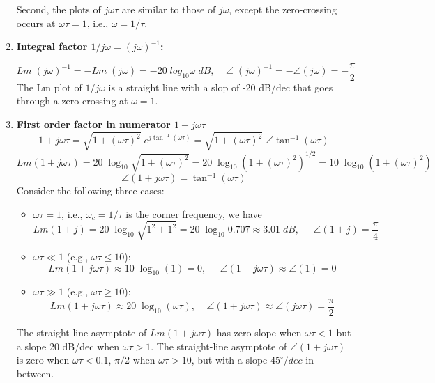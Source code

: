 \documentclass{article}
\begin{document}
\begin{enumerate}
  Second, the plots of $j\omega\tau$ are similar to those of $j\omega$, except the
  zero-crossing occurs at $\omega\tau=1$, i.e., $\omega=1/\tau$.

\item {\bf Integral factor $1/j\omega=(j\omega)^{-1}$:}

  \begin{equation} 
    Lm \;(j\omega)^{-1}=-Lm\;(j\omega)=-20\;log_{10} \omega\;dB,
    \;\;\;\;\angle\; (j\omega)^{-1}=-\angle(j\omega)=-\frac{\pi}{2} 
  \end{equation}
  The Lm plot of $1/j\omega$ is a straight line with a slop of -20 dB/dec that goes
  through a zero-crossing at $\omega=1$.

\item {\bf First order factor in numerator $1+j\omega\tau$}
  \begin{equation} 
    1+j\omega \tau=\sqrt{1+(\omega \tau)^2}\;e^{j\tan^{-1}(\omega \tau)}
    =\sqrt{1+(\omega \tau)^2}\;\angle \tan^{-1}(\omega \tau) 
  \end{equation}
  \begin{equation}
    Lm(1+j\omega \tau)=20\;\log_{10}\sqrt{1+(\omega \tau)^2}
    =20\;\log_{10}(1+(\omega \tau)^2)^{1/2}=10\;\log_{10}(1+(\omega \tau)^2) 
  \end{equation}
  \begin{equation}
    \angle(1+j\omega \tau)=\tan^{-1}(\omega\tau) 
  \end{equation}
  Consider the following three cases:
  \begin{itemize}
  \item $\omega\tau=1$, i.e., $\omega_c=1/\tau$ is the corner frequency, we have
    \begin{equation} 
      Lm(1+j)=20\;\log_{10} \sqrt{1^2+1^2}=20\;\log_{10} 0.707\approx 3.01\;dB,\;\;\;\;\;
      \angle(1+j)=\frac{\pi}{4} 
    \end{equation}
  \item $\omega\tau \ll 1$ (e.g., $\omega\tau\le 10$):
    \begin{equation}
      Lm(1+j\omega \tau)\approx10\;\log_{10}(1)=0,\;\;\;\;\;
      \angle(1+j\omega \tau)\approx \angle(1)=0 
    \end{equation}
  \item $\omega\tau \gg 1$ (e.g., $\omega\tau\ge 10$):
    \begin{equation}
      Lm(1+j\omega \tau)\approx 20\;\log_{10}(\omega \tau),\;\;\;\;
      \angle(1+j\omega \tau)\approx \angle(j\omega \tau)=\frac{\pi}{2}
    \end{equation}
  \end{itemize}
  The straight-line asymptote of $Lm(1+j\omega\tau)$ has zero slope when $\omega\tau<1$
  but a slope 20 dB/dec when $\omega\tau>1$. The straight-line asymptote of 
  $\angle(1+j\omega\tau)$ is zero when $\omega\tau<0.1$, $\pi/2$ when $\omega\tau>10$, 
  but with a slope $45^\circ/dec$ in between.


\end{enumerate}
\end{document}
